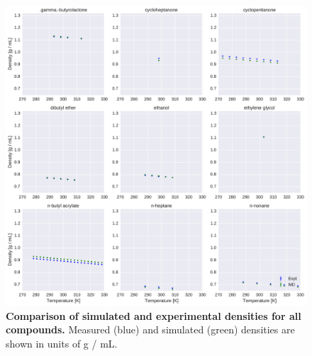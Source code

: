 \documentclass[aps,pre,twocolumn,nofootinbib,superscriptaddress,linenumbers]{revtex4-1}
\begin{document}
\begin{figure}[alldensity]

\ContinuedFloat

\includegraphics[width=\textwidth]{./figures/densities_versus_temperature_part4.pdf}

\caption{{\bf Comparison of simulated and experimental densities for all compounds.} 
Measured (blue) and simulated (green) densities are shown in units of g / mL.
\label{figure:AllDensities}
}

\end{figure}



\end{document}
